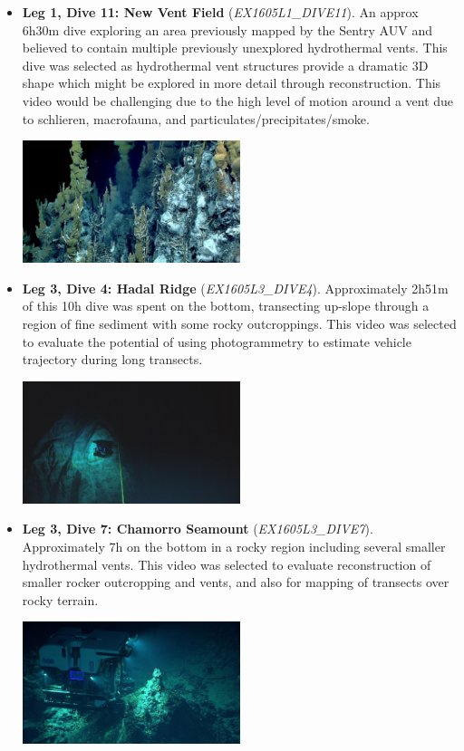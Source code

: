\documentclass[letterpaper,12pt]{article}
\begin{document}
\begin{itemize}
    \item \textbf{Leg 1, Dive 11: New Vent Field} (\textit{EX1605L1\_DIVE11}).   An approx 6h30m dive exploring an area previously mapped by the Sentry AUV and believed to contain multiple previously unexplored hydrothermal vents. This dive was selected as hydrothermal vent structures provide a dramatic 3D shape which might be explored in more detail through reconstruction.    This video would be challenging due to the high level of motion around a vent due to schlieren, macrofauna, and particulates/precipitates/smoke.
    
    \includegraphics[width=0.5\textwidth]{images/EX1605L1_DIVE11_highlight.jpg}
    
    \item \textbf{Leg 3, Dive 4: Hadal Ridge} (\textit{EX1605L3\_DIVE4}).  Approximately 2h51m of this 10h dive was spent on the bottom, transecting up-slope through a region of fine sediment with some rocky outcroppings.  This video was selected to evaluate the potential of using photogrammetry to estimate vehicle trajectory during long transects.
    
    \includegraphics[width=0.5\textwidth]{images/EX1605L3_DIVE4_highlight.jpg}
    
    \item \textbf{Leg 3, Dive 7: Chamorro Seamount} (\textit{EX1605L3\_DIVE7}).  Approximately 7h on the bottom in a rocky region including several smaller hydrothermal vents.    This video was selected to evaluate reconstruction of smaller rocker outcropping and vents, and also for mapping of transects over rocky terrain.
    
    \includegraphics[width=0.5\textwidth]{images/EX1605L3_DIVE7_highlight.jpg}
    

\end{itemize}
\end{document}
